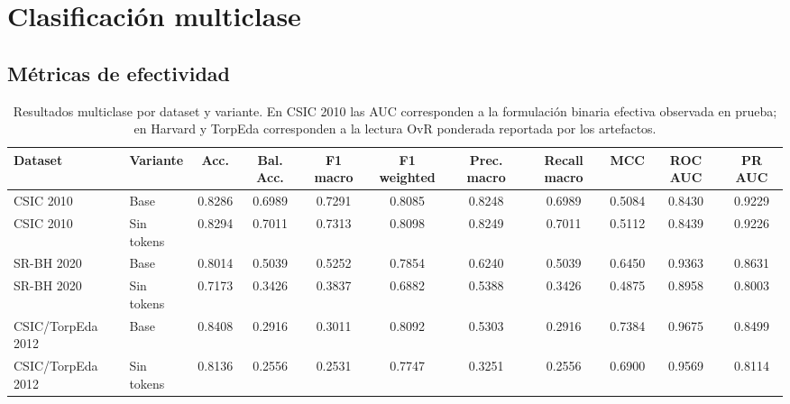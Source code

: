 \documentclass[12pt,oneside]{report}
\begin{document}
\section{Clasificación multiclase}
\subsection{Métricas de efectividad}
\begin{table}[H]
\centering
\caption{Resultados multiclase por dataset y variante. En CSIC 2010 las AUC corresponden a la formulación binaria efectiva observada en prueba; en Harvard y TorpEda corresponden a la lectura OvR ponderada reportada por los artefactos.}
\label{tab:res-mc-eff}
\scriptsize
\renewcommand{\arraystretch}{1.12}
\begin{adjustbox}{max width=\textwidth}
\begin{tabular}{llccccccccc}
\toprule
\textbf{Dataset} & \textbf{Variante} & \textbf{Acc.} & \textbf{Bal. Acc.} & \textbf{F1 macro} & \textbf{F1 weighted} & \textbf{Prec. macro} & \textbf{Recall macro} & \textbf{MCC} & \textbf{ROC AUC} & \textbf{PR AUC} \\
\midrule
CSIC 2010 & Base & 0.8286 & 0.6989 & 0.7291 & 0.8085 & 0.8248 & 0.6989 & 0.5084 & 0.8430 & 0.9229 \\CSIC 2010 & Sin tokens & 0.8294 & 0.7011 & 0.7313 & 0.8098 & 0.8249 & 0.7011 & 0.5112 & 0.8439 & 0.9226 \\SR-BH 2020 & Base & 0.8014 & 0.5039 & 0.5252 & 0.7854 & 0.6240 & 0.5039 & 0.6450 & 0.9363 & 0.8631 \\SR-BH 2020 & Sin tokens & 0.7173 & 0.3426 & 0.3837 & 0.6882 & 0.5388 & 0.3426 & 0.4875 & 0.8958 & 0.8003 \\CSIC/TorpEda 2012 & Base & 0.8408 & 0.2916 & 0.3011 & 0.8092 & 0.5303 & 0.2916 & 0.7384 & 0.9675 & 0.8499 \\CSIC/TorpEda 2012 & Sin tokens & 0.8136 & 0.2556 & 0.2531 & 0.7747 & 0.3251 & 0.2556 & 0.6900 & 0.9569 & 0.8114 \\\bottomrule
\end{tabular}
\end{adjustbox}
\end{table}
\end{document}
